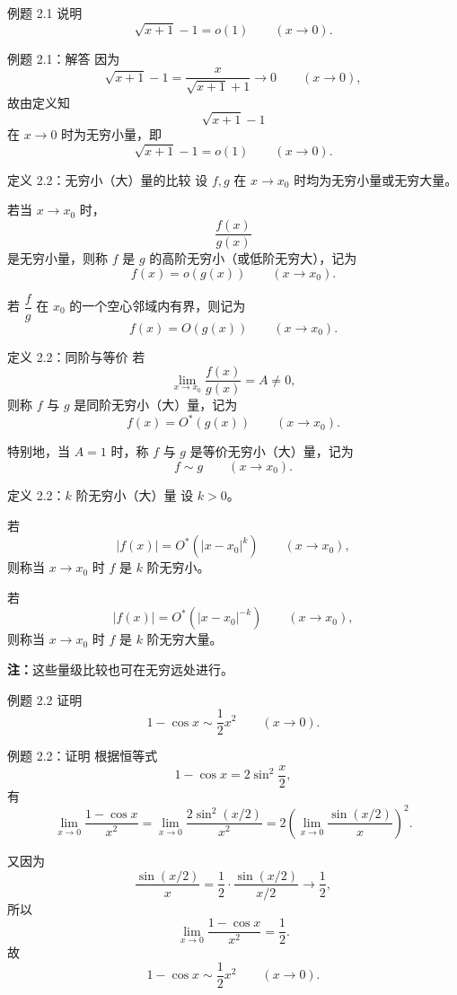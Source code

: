 ﻿\documentclass[aspectratio=169,11pt]{ctexbeamer}
\begin{document}
\begin{frame}{例题 2.1}
说明
\[
  \sqrt{x+1}-1=o(1)\qquad (x\to 0).
\]
\end{frame}

\begin{frame}{例题 2.1：解答}
因为
\[
  \sqrt{x+1}-1=\frac{x}{\sqrt{x+1}+1}\to 0\qquad (x\to 0),
\]
故由定义知
\[
  \sqrt{x+1}-1
\]
在 $x\to 0$ 时为无穷小量，即
\[
  \sqrt{x+1}-1=o(1)\qquad (x\to 0).
\]
\end{frame}

\begin{frame}{定义 2.2：无穷小（大）量的比较}
设 $f,g$ 在 $x\to x_0$ 时均为无穷小量或无穷大量。

\vspace{0.4em}
若当 $x\to x_0$ 时，
\[
  \frac{f(x)}{g(x)}
\]
是无穷小量，则称 $f$ 是 $g$ 的高阶无穷小（或低阶无穷大），记为
\[
  f(x)=o(g(x))\qquad (x\to x_0).
\]

\vspace{0.4em}
若 $\dfrac{f}{g}$ 在 $x_0$ 的一个空心邻域内有界，则记为
\[
  f(x)=O(g(x))\qquad (x\to x_0).
\]
\end{frame}

\begin{frame}{定义 2.2：同阶与等价}
若
\[
  \lim_{x\to x_0}\frac{f(x)}{g(x)}=A\ne 0,
\]
则称 $f$ 与 $g$ 是同阶无穷小（大）量，记为
\[
  f(x)=O^*(g(x))\qquad (x\to x_0).
\]

特别地，当 $A=1$ 时，称 $f$ 与 $g$ 是等价无穷小（大）量，记为
\[
  f\sim g\qquad (x\to x_0).
\]
\end{frame}

\begin{frame}{定义 2.2：$k$ 阶无穷小（大）量}
设 $k>0$。

若
\[
  |f(x)|=O^*(|x-x_0|^k)\qquad (x\to x_0),
\]
则称当 $x\to x_0$ 时 $f$ 是 $k$ 阶无穷小。

\vspace{0.6em}
若
\[
  |f(x)|=O^*(|x-x_0|^{-k})\qquad (x\to x_0),
\]
则称当 $x\to x_0$ 时 $f$ 是 $k$ 阶无穷大量。

\vspace{0.6em}
\textbf{注：}这些量级比较也可在无穷远处进行。
\end{frame}

\begin{frame}{例题 2.2}
证明
\[
  1-\cos x\sim \frac12 x^2\qquad (x\to 0).
\]
\end{frame}

\begin{frame}{例题 2.2：证明}
根据恒等式
\[
  1-\cos x=2\sin^2\frac{x}{2},
\]
有
\[
  \lim_{x\to 0}\frac{1-\cos x}{x^2}
  =
  \lim_{x\to 0}\frac{2\sin^2(x/2)}{x^2}
  =
  2\left(\lim_{x\to 0}\frac{\sin(x/2)}{x}\right)^2.
\]

又因为
\[
  \frac{\sin(x/2)}{x}
  =
  \frac12\cdot \frac{\sin(x/2)}{x/2}\to \frac12,
\]
所以
\[
  \lim_{x\to 0}\frac{1-\cos x}{x^2}=\frac12.
\]
故
\[
  1-\cos x\sim \frac12x^2\qquad (x\to 0).
\]
\end{frame}
\end{document}
